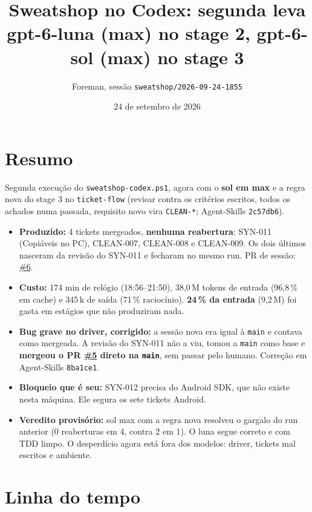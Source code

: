 \documentclass[11pt,a4paper]{article}
\title{Sweatshop no Codex: segunda leva\\\large gpt-6-luna (max) no stage 2, gpt-6-sol (max) no stage 3}
\author{Foreman, sessão \texttt{sweatshop/2026-09-24-1855}}
\date{24 de setembro de 2026}
\begin{document}
\maketitle

\section*{Resumo}

Segunda execução do \texttt{sweatshop-codex.ps1}, agora com o \textbf{sol em
max} e a regra nova do stage 3 no \texttt{ticket-flow} (revisar contra os
critérios escritos, todos os achados numa passada, requisito novo vira
\texttt{CLEAN-*}; Agent-Skills \texttt{2c57db6}).

\begin{itemize}
  \item \textbf{Produzido:} 4 tickets mergeados, \textbf{nenhuma reabertura}:
        SYN-011 (Copiáveis no PC), CLEAN-007, CLEAN-008 e CLEAN-009. Os dois
        últimos nasceram da revisão do SYN-011 e fecharam no mesmo run. PR de
        sessão: \href{https://github.com/Laginho/SynchroNice/pull/6}{\#6}.
  \item \textbf{Custo:} 174 min de relógio (18:56--21:50), 38,0\,M tokens de
        entrada (96,8\,\% em cache) e 345\,k de saída (71\,\% raciocínio).
        \textbf{24\,\% da entrada} (9,2\,M) foi gasta em estágios que não
        produziram nada.
  \item \textbf{Bug grave no driver, corrigido:} a sessão nova era igual à
        \texttt{main} e contava como mergeada. A revisão do SYN-011 não a viu,
        tomou a \texttt{main} como base e \textbf{mergeou o PR
        \href{https://github.com/Laginho/SynchroNice/pull/5}{\#5} direto na
        \texttt{main}}, sem passar pelo humano. Correção em Agent-Skills
        \texttt{8ba1ce1}.
  \item \textbf{Bloqueio que é seu:} SYN-012 precisa do Android SDK, que não
        existe nesta máquina. Ele segura os sete tickets Android.
  \item \textbf{Veredito provisório:} sol max com a regra nova resolveu o
        gargalo do run anterior (0 reaberturas em 4, contra 2 em 1). O luna
        segue correto e com TDD limpo. O desperdício agora está fora dos
        modelos: driver, tickets mal escritos e ambiente.
\end{itemize}

\section{Linha do tempo}
\end{document}

